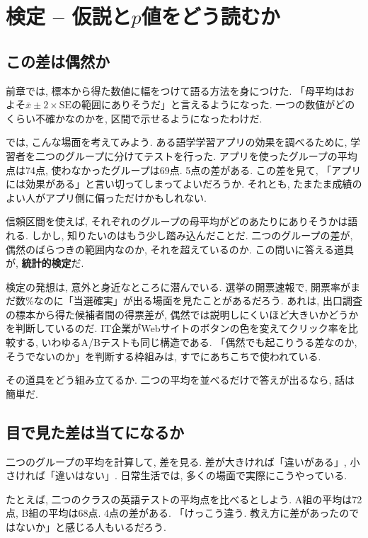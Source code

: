 ﻿\section{検定 -- 仮説と$p$値をどう読むか}

  \subsection{この差は偶然か}

    前章では, 標本から得た数値に幅をつけて語る方法を身につけた.
    「母平均はおよそ$\bar{x} \pm 2 \times \mathrm{SE}$の範囲にありそうだ」と言えるようになった.
    一つの数値がどのくらい不確かなのかを, 区間で示せるようになったわけだ.

    では, こんな場面を考えてみよう.
    ある語学学習アプリの効果を調べるために, 学習者を二つのグループに分けてテストを行った.
    アプリを使ったグループの平均点は74点, 使わなかったグループは69点.
    5点の差がある.
    この差を見て, 「アプリには効果がある」と言い切ってしまってよいだろうか.
    それとも, たまたま成績のよい人がアプリ側に偏っただけかもしれない.

    信頼区間を使えば, それぞれのグループの母平均がどのあたりにありそうかは語れる.
    しかし, 知りたいのはもう少し踏み込んだことだ.
    二つのグループの差が, 偶然のばらつきの範囲内なのか, それを超えているのか.
    この問いに答える道具が, \textbf{統計的検定}だ.

    検定の発想は, 意外と身近なところに潜んでいる.
    選挙の開票速報で, 開票率がまだ数\%なのに「当選確実」が出る場面を見たことがあるだろう.
    あれは, 出口調査の標本から得た候補者間の得票差が, 偶然では説明しにくいほど大きいかどうかを判断しているのだ.
    IT企業がWebサイトのボタンの色を変えてクリック率を比較する, いわゆるA/Bテストも同じ構造である.
    「偶然でも起こりうる差なのか, そうでないのか」を判断する枠組みは, すでにあちこちで使われている.

    その道具をどう組み立てるか.
    二つの平均を並べるだけで答えが出るなら, 話は簡単だ.


  \subsection{目で見た差は当てになるか}

    二つのグループの平均を計算して, 差を見る.
    差が大きければ「違いがある」, 小さければ「違いはない」.
    日常生活では, 多くの場面で実際にこうやっている.

    たとえば, 二つのクラスの英語テストの平均点を比べるとしよう.
    A組の平均は72点, B組の平均は68点.
    4点の差がある.
    「けっこう違う. 教え方に差があったのではないか」と感じる人もいるだろう.

